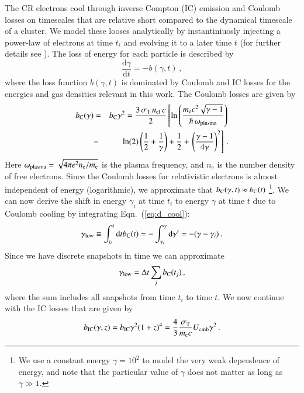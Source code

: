 \documentclass[useAMS,usenatbib]{mn2e}
\newcommand{\dd}{\mathrm{d}}
\newcommand{\e}{\mathrm{e}}
\newcommand{\IC}{\mathrm{IC}}
\newcommand{\low}{\mathrm{low}}
\newcommand{\gam}{\gamma}
\begin{document}
The CR electrons cool through inverse Compton (IC) emission and
Coulomb losses on timescales that are relative short compared to the
dynamical timescale of a cluster. We model these looses analytically
by instantiniuosly injecting a power-law of electrons at time $t_i$
and evolving it to a later time $t$ (for further details see
\citep{1999ApJ...520..529S}). The loss of energy for each particle is
described by
\begin{equation}
\label{eq:d_cool}
\frac{\dd \gam}{\dd t} = - b(\gam,t)\,,
\end{equation}
where the loss function $b(\gam,t)$ is dominated by Coulomb and IC
losses for the energies and gas densities relevant in this work. The
Coulomb losses are given by
\begin{eqnarray}
  \label{eq:b_C}
  b_\rmn{C}(\gam) &=& b_\rmn{C} \gam^2 
  = \frac{3\,\sigma_\rmn{T}\,n_\rmn{el}\,c}{2}
  \left[\ln\left(\frac{m_\e c^2 \sqrt{\gam-1}}{\hbar\,\omega_\rmn{plasma}}\right)\right.\nonumber \\
    &-&\ln(2)\left(\frac{1}{2}+\frac{1}{\gam}\right)+\frac{1}{2}+
    \left.\left(\frac{\gam-1}{4\gam}\right)^2\right]\,.
\end{eqnarray}
Here $\omega_\rmn{plasma} = \sqrt{4\pi e^2 n_\e / m_\e}$ is the plasma
frequency, and $n_\e$ is the number density of free electrons. Since
the Coulomb losses for relativistic electrons is almost independent of
energy (logarithmic), we approximate that $b_\rmn{C}(\gam,t)\approx
b_\rmn{C}(t)$ \footnote{We use a constant energy $\gamma=10^2$ to
  model the very weak dependence of energy, and note that the
  particular value of $\gamma$ does not matter as long as
  $\gamma\gg1$.}. We can now derive the shift in energy $\gam_i$ at
time $t_i$ to energy $\gam$ at time $t$ due to Coulomb cooling by
integrating Eqn.~(\ref{eq:d_cool}):
\begin{eqnarray}
  \label{eq:gamma_low}
  \gam_\low \equiv\int_{t_i}^{t}\dd t b_\rmn{C}(t) = 
  -\int_{\gam_i}^{\gam}\dd \gam' = -(\gam-\gam_i)\,.
\end{eqnarray}
Since we have discrete snapshots in time we can approximate 
\begin{eqnarray}
  \label{eq:gamma_low_sum}
  \gam_\low = \Delta t \sum_j b_\rmn{C}(t_j)\,,
\end{eqnarray}
where the sum includes all snapshots from time $t_i$ to time $t$. We
now continue with the IC losses that are given by
\begin{equation}
  \label{eq:b_IC}
  b_\IC(\gam,z) = b_\IC \gam^2 (1+z)^4
  = \frac{4}{3}\frac{\sigma_\rmn{T}}{m_\e c} U_\rmn{cmb} \gam^2\,.
\end{equation}
\end{document}
